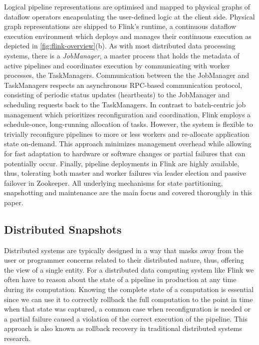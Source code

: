 Logical pipeline representations are optimised and mapped to physical graphs of dataflow operators encapsulating the user-defined logic at the client side. Physical graph representations are shipped to Flink's runtime, a continuous dataflow execution environment which deploys and manages their continuous execution as depicted in \autoref{fig:flink-overview}(b). As with most distributed data processing systems, there is a \emph{JobManager}, a master process that holds the metadata of active pipelines and coordinates execution by communicating with worker processes, the TaskManagers. Communication between the the JobManager and TaskManagers respects an asynchronous RPC-based communication protocol, consisting of periodic status updates (heartbeats) to the JobManager and scheduling requests back to the TaskManagers. In contrast to batch-centric job management \cite{zaharia2012discretized,venkataramandrizzle} which prioritizes reconfiguration and coordination, Flink employs a schedule-once, long-running allocation of tasks. However, the system is flexible to trivially reconfigure pipelines to more or less workers and re-allocate application state on-demand. This approach minimizes management overhead while allowing for fast adaptation to hardware or software changes or partial failures that can potentially occur. Finally, pipeline deployments in Flink are highly available, thus, tolerating both master and worker failures via leader election and passive failover in Zookeeper. All underlying mechanisms for state partitioning, snapshotting and maintenance are the main focus and covered thoroughly in this paper.


\subsection{Distributed Snapshots}

Distributed systems are typically designed in a way that masks away from the user or programmer concerns related to their distributed nature, thus, offering the view of a single entity. For a distributed data computing system like Flink we often have to reason about the state of a pipeline in production at any time during its computation. Knowing the complete state of a computation is essential since we can use it to correctly rollback the full computation to the point in time when that state was captured, a common case when reconfiguration is needed or a partial failure caused a violation of the correct execution of the pipeline. This approach is also known as rollback recovery \cite{elnozahy2002survey} in traditional distributed systems research.

